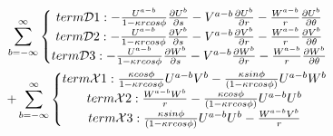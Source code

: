 \documentclass{Note}
\begin{document}
\begin{equation}
\begin{aligned}
\\\sum_{b=-\infty}^{\infty}
\left\{\begin{matrix}
term\mathcal{D}1: -{U^{a-b}\over {1-\kappa r cos\phi}}  {{\partial U^b} \over {\partial s}}-V^{a-b}{{\partial U^b}\over{\partial r}}-{W^{a-b}\over r}{{\partial U^b}\over {\partial \theta}}\\
term\mathcal{D}2: -{U^{a-b}\over {1-\kappa r cos\phi}}  {{\partial V^b} \over {\partial s}}-V^{a-b}{{\partial V^b}\over{\partial r}}-{W^{a-b}\over r}{{\partial V^b}\over {\partial \theta}}\\
term\mathcal{D}3: -{U^{a-b}\over {1-\kappa r cos\phi}}  {{\partial W^b} \over {\partial s}}-V^{a-b}{{\partial W^b}\over{\partial r}}-{W^{a-b}\over r}{{\partial W^b}\over {\partial \theta}}\\
\end{matrix}\right.\\
+\sum_{b=-\infty}^{\infty}\left\{\begin{matrix}
term\mathcal{X}1: {\kappa cos\phi \over{1-\kappa rcos\phi}}U^{a-b}V^b-{\kappa sin\phi \over{(1-\kappa r cos\phi)}}U^{a-b}W^b\\
term\mathcal{X}2: {W^{a-b}W^b\over{r}}-{\kappa cos\phi \over{(1-\kappa r cos\phi)}}U^{a-b}U^b\\
term\mathcal{X}3: {\kappa sin\phi \over{(1-\kappa r cos\phi)}}U^{a-b}U^b-{W^{a-b}V^b\over{r}}\\
\end{matrix}\right.
\end{aligned}
\end{equation}
\end{document}
